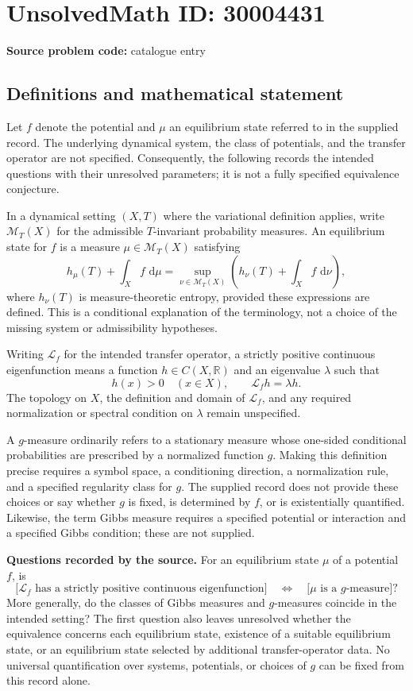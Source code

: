 \documentclass[11pt]{article}
\newcommand{\R}{\mathbb{R}}
\newcommand{\dd}{\,\mathrm{d}}
\begin{document}
\section*{UnsolvedMath ID: 30004431}
\textbf{Source problem code:} catalogue entry
\subsection{Definitions and mathematical statement}
Let \(f\) denote the potential and \(\mu\) an equilibrium state referred to in the supplied record. The underlying dynamical system, the class of potentials, and the transfer operator are not specified. Consequently, the following records the intended questions with their unresolved parameters; it is not a fully specified equivalence conjecture.

In a dynamical setting \((X,T)\) where the variational definition applies, write \(\mathcal M_T(X)\) for the admissible \(T\)-invariant probability measures. An equilibrium state for \(f\) is a measure \(\mu\in\mathcal M_T(X)\) satisfying
\[
 h_\mu(T)+\int_X f\,\dd\mu
 =\sup_{\nu\in\mathcal M_T(X)}\left(h_\nu(T)+\int_X f\,\dd\nu\right),
\]
where \(h_\nu(T)\) is measure-theoretic entropy, provided these expressions are defined. This is a conditional explanation of the terminology, not a choice of the missing system or admissibility hypotheses.

Writing \(\mathcal L_f\) for the intended transfer operator, a strictly positive continuous eigenfunction means a function \(h\in C(X,\R)\) and an eigenvalue \(\lambda\) such that
\[
 h(x)>0\quad(x\in X),\qquad \mathcal L_f h=\lambda h.
\]
The topology on \(X\), the definition and domain of \(\mathcal L_f\), and any required normalization or spectral condition on \(\lambda\) remain unspecified.

A \(g\)-measure ordinarily refers to a stationary measure whose one-sided conditional probabilities are prescribed by a normalized function \(g\). Making this definition precise requires a symbol space, a conditioning direction, a normalization rule, and a specified regularity class for \(g\). The supplied record does not provide these choices or say whether \(g\) is fixed, is determined by \(f\), or is existentially quantified. Likewise, the term Gibbs measure requires a specified potential or interaction and a specified Gibbs condition; these are not supplied.

\textbf{Questions recorded by the source.} For an equilibrium state \(\mu\) of a potential \(f\), is
\[
 \bigl[\mathcal L_f\text{ has a strictly positive continuous eigenfunction}\bigr]
 \quad\Longleftrightarrow\quad
 \bigl[\mu\text{ is a }g\text{-measure}\bigr]?
\]
More generally, do the classes of Gibbs measures and \(g\)-measures coincide in the intended setting? The first question also leaves unresolved whether the equivalence concerns each equilibrium state, existence of a suitable equilibrium state, or an equilibrium state selected by additional transfer-operator data. No universal quantification over systems, potentials, or choices of \(g\) can be fixed from this record alone.
\end{document}
